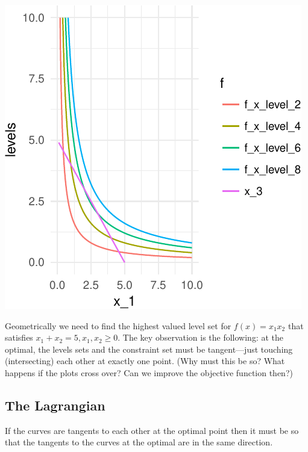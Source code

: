 \documentclass[11pt,]{article}
\begin{document}
\begin{center}\includegraphics{Optimization_2_files/figure-latex/opt_dim_2_eq_constr-1} \end{center}

Geometrically we need to find the highest valued level set for
\(f(x) = x_1x_2\) that satisfies \(x_1+x_2=5, x_1, x_2\geq 0\). The key
observation is the following: at the optimal, the levels sets and the
constraint set must be tangent---just touching (intersecting) each other
at exactly one point. (Why must this be so? What happens if the plots
cross over? Can we improve the objective function then?)

\subsection{The Lagrangian}\label{the-lagrangian}

If the curves are tangents to each other at the optimal point then it
must be so that the tangents to the curves at the optimal are in the
same direction.
\end{document}
